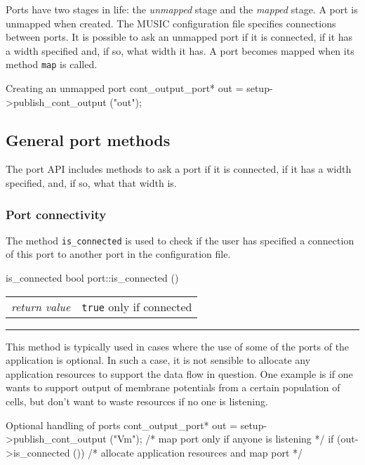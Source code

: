 \documentclass[a4paper,twoside]{report}
\makeatletter
\newenvironment{parameters}%
{\begin{tabular}{@{\hspace{2em}}lp{0.6\textwidth}}}%
{\end{tabular}\par\vspace{1mm}\par\hrule\par\vspace{5mm}}
\makeatother
\begin{document}
Ports have two stages in life: the \emph{unmapped} stage and the
\emph{mapped} stage.  A port is unmapped when created.  The MUSIC
configuration file specifies connections between ports.  It is
possible to ask an unmapped port if it is connected, if it has a width
specified and, if so, what width it has.  A port becomes mapped when
its method \lstinline|map| is called.

\begin{code}{Creating an unmapped port}
cont_output_port* out =
   setup->publish_cont_output ("out");
\end{code}

\subsection{General port methods}

The port API includes methods to ask a port if it is connected, if it
has a width specified, and, if so, what that width is.

\subsubsection{Port connectivity}

The method \lstinline|is_connected| is used to check if the user has
specified a connection of this port to another port in the
configuration file.

\begin{head}{is_connected}
  bool port::is_connected ()
\end{head}
\begin{parameters}
  \emph{return value} & \lstinline|true| only if connected\\
\end{parameters}

This method is typically used in cases where the use of some of the
ports of the application is optional.  In such a case, it is not
sensible to allocate any application resources to support the data
flow in question.  One example is if one wants to support output of
membrane potentials from a certain population of cells, but don't want
to waste resources if no one is listening.

\begin{code}{Optional handling of ports}
cont_output_port* out =
   setup->publish_cont_output ("Vm");
/* map port only if anyone is listening */
if (out->is_connected ())
  /* allocate application resources and map port */
\end{code}
\end{document}
